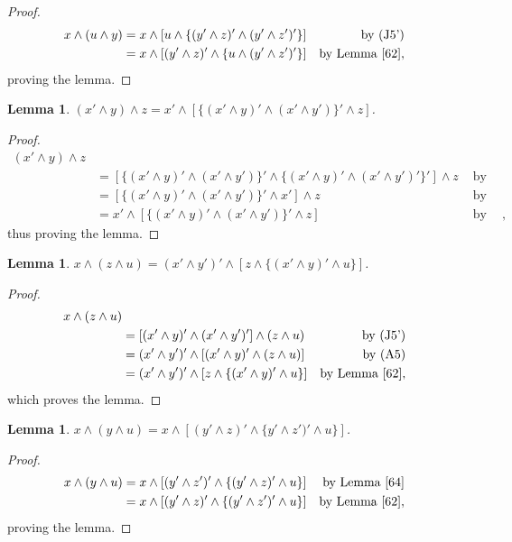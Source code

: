 \documentclass{amsart}
\theoremstyle{plain}
\newtheorem{lemma}[theorem]{Lemma}
\theoremstyle{problem}
\theoremstyle{definition}
\theoremstyle{remark}
\numberwithin{equation}{section}
\begin{document}
\begin{proof}
\begin{align*}
    x \land (u \land y) &= x \land [u \land \{(y' \land z)' \land (y' \land z')'\}]  &\text{ by (J5')}\\
              &= x \land [(y' \land z)' \land \{u \land (y' \land z')' \}]  &\text{by Lemma \ref{62}},
\end{align*}
proving the lemma.
\end{proof}

\begin{lemma} \label{66} 
    $(x' \land y) \land z = x' \land [\{(x' \land y)' \land (x' \land y')\}' \land z] $.
\end{lemma}

\begin{proof}
\begin{align*}
    (x' \land y) \land z \\
       &= [\{(x' \land y)' \land (x' \land y')\}' \land \{(x' \land y)' \land (x' \land y')'\}'] \land z  &\text{ by (J5')}\\
       &= [\{(x' \land y)' \land (x' \land y')\}' \land x'] \land z  &\text{ by (J5')}\\
       &= x' \land [\{(x' \land y)' \land (x' \land y')\}' \land z]  &\text{ by (A5)},
\end{align*}
thus proving the lemma.
\end{proof}

\begin{lemma} \label{67} 
    $x \land (z \land u) = (x' \land y')' \land [z \land \{(x' \land y)' \land u\}]  $.
\end{lemma}
\begin{proof}
\begin{align*}
    x \land (z \land u) \\
       &= [(x' \land y)' \land (x' \land y')']  \land (z \land u)  &\text{ by (J5')}\\
       &= (x' \land y')' \land [(x' \land y)' \land (z \land u)]  &\text{ by (A5)}\\
       &= (x' \land y')' \land [z \land \{(x' \land y)' \land u\}] &\text{by Lemma \ref{62}},
\end{align*}
which proves the lemma.
\end{proof}

\begin{lemma} \label{68} 
    $x \land (y \land u) = x \land [(y' \land z)' \land \{y' \land z')' \land u\}]  $.
\end{lemma}
\begin{proof}
\begin{align*}
    x \land (y \land u) 
       &= x \land [(y' \land z')' \land \{(y' \land z)' \land u\}] &\text{by Lemma \ref{64}}\\
       &= x \land [(y' \land z)' \land \{(y' \land z')' \land u\}] &\text{by Lemma \ref{62}},
\end{align*}
proving the lemma.
\end{proof}
\end{document}
